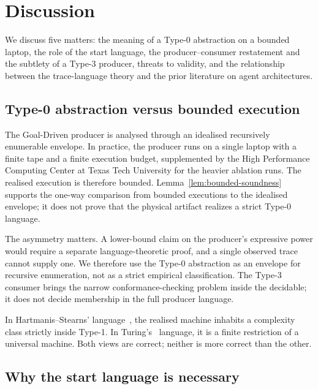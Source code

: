 \section{Discussion}
\label{sec:discussion}

We discuss five matters: the meaning of a Type-0 abstraction on a
bounded laptop, the role of the start language, the producer--consumer
restatement and the subtlety of a Type-3 producer, threats to
validity, and the relationship between the trace-language theory
and the prior literature on agent architectures.

\subsection{Type-0 abstraction versus bounded execution}

The Goal-Driven producer is analysed through an idealised
recursively enumerable envelope.  In practice, the producer runs on
a single laptop with a finite tape and a finite execution budget,
supplemented by the High Performance Computing Center at Texas Tech
University for the heavier ablation runs.  The realised execution is
therefore bounded.  Lemma~\ref{lem:bounded-soundness} supports the
one-way comparison from bounded executions to the idealised envelope;
it does not prove that the physical artifact realizes a strict
Type-0 language.

The asymmetry matters.  A lower-bound claim on the producer's
expressive power would require a separate language-theoretic proof,
and a single observed trace cannot supply one.  We therefore use the
Type-0 abstraction as an envelope for recursive enumeration, not as a
strict empirical classification.  The Type-3 consumer brings the
narrow conformance-checking problem inside the decidable; it does
not decide membership in the full producer language.

In Hartmanis--Stearns'
language~\cite{hartmanis1965computational}, the realised machine
inhabits a complexity class strictly inside Type-1.  In
Turing's~\cite{turing1936computable} language, it is a finite
restriction of a universal machine.  Both views are correct;
neither is more correct than the other.

\subsection{Why the start language is necessary}

